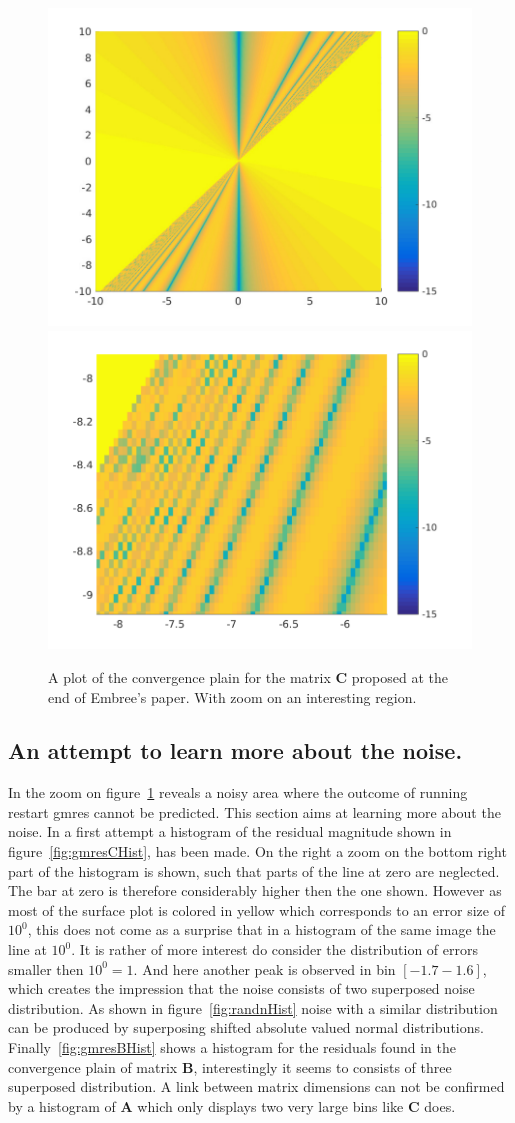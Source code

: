 \begin{figure}
\centering
\includegraphics[width=0.45\linewidth]{../src/figure/twoDPaper}
\includegraphics[width=0.45\linewidth]{../src/figure/twoDZoom}
\caption{A plot of the convergence plain for the matrix $\mathbf{C}$ proposed at the end of Embree's paper. With zoom on an interesting region.}
\label{fig:twoDZoom}
\end{figure}

\subsection{An attempt to learn more about the noise.}
In the zoom on figure~\ref{fig:twoDZoom} reveals a noisy area where the outcome of running restart gmres cannot be predicted. This section aims at learning more about the noise. In a first attempt a histogram of the residual magnitude shown in figure~\ref{fig:gmresCHist}, has been made. On the right a zoom on the bottom right part of the histogram is shown, such that parts of the line at zero are neglected. The bar at zero is therefore considerably higher then the one shown. However as most of the surface plot is colored in yellow which corresponds to an error size of $10^0$, this does not come as a surprise that in a histogram of the same image the line at $10^0$. It is rather of more interest do consider the distribution of errors smaller then $10^0 = 1$. And here another peak is observed in bin $[-1.7 -1.6]$, which creates the impression that the noise consists of two superposed noise distribution. As shown in figure~\ref{fig:randnHist} noise with a similar distribution can be produced by superposing shifted absolute valued normal distributions. Finally~\ref{fig:gmresBHist} shows a histogram for the residuals found in the convergence plain of matrix $\mathbf{B}$, interestingly it seems to consists of three superposed distribution. A link between matrix dimensions can not be confirmed by a histogram of $\mathbf{A}$ which only displays two very large bins like $\mathbf{C}$ does.

